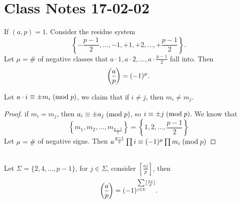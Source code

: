 \section{Class Notes 17-02-02}
\begin{lemma}
	If $(a,p)=1$. Consider the residue system 
	$$\left\{-\frac{p-1}{2},\ldots,-1,+1,+2,\ldots,+\frac{p-1}{2}\right\}.$$ Let $\mu=\#$ of negative classes that $a\cdot1,a\cdot2,\ldots,a\cdot\frac{p-1}{2}$ fall into. Then 
	$$\leg{a}{p}=(-1)^\mu.
	$$
\end{lemma}
Let $a\cdot i \equiv \pm m_i\;(\mbox{mod}{\;p})$, we claim that if $i\ne j$, then $m_i\ne m_j$.
\begin{proof}
	if $m_i=m_j$, then $a_i\equiv \pm a_j\;(\mbox{mod}{\;p})$, so $i\equiv \pm j\;(\mbox{mod}{\;p})$. We know that 
	$$\left\{m_1,m_2,\ldots,m_{\frac{p-1}{2}} \right\}=\left\{1,2,\ldots,\frac{p-1}{2}\right\}$$Let $\mu=\#$ of negative signs. Then $a^{\frac{p-1}{2}}\prod i\equiv (-1)^\mu \prod m_i\;(\mbox{mod}{\;p})$
\end{proof}
\begin{lemma}\mbox{}\\
	Let $\Sigma=\{2,4,\ldots, p-1 \}$, for $j\in\Sigma$, consider $[\frac{aj}{p}]$, then
	$$\leg{a}{p} = (-1)^{\sum\limits_{j\in\Sigma}[\frac{aj}{p}]}.$$
\end{lemma}

